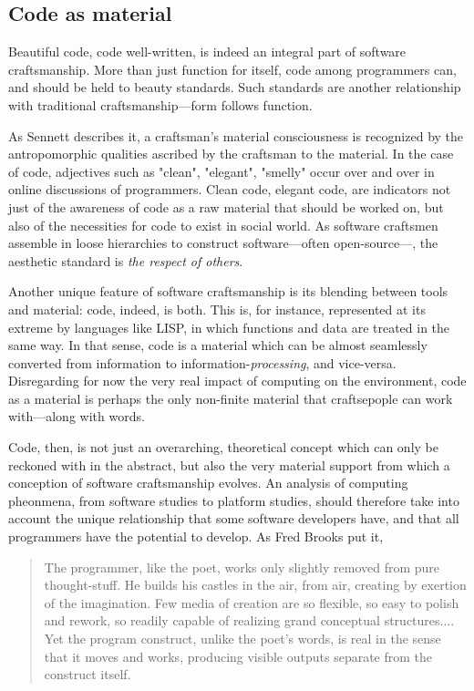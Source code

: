 \documentclass{article}
\begin{document}
\subsection{Code as material}

Beautiful code, code well-written, is indeed an integral part of software craftsmanship\cite{oram_beautiful_2007}. More than just function for itself, code among programmers can, and should be held to beauty standards\cite{pineiro_aesthetics_2003}. Such standards are another relationship with traditional craftsmanship---form follows function.

As Sennett describes it, a craftsman's material consciousness is recognized by the antropomorphic qualities ascribed by the craftsman to the material\cite{sennett_craftsman_2009}. In the case of code, adjectives such as "clean", "elegant", "smelly" occur over and over in online discussions of programmers. Clean code, elegant code, are indicators not just of the awareness of code as a raw material that should be worked on, but also of the necessities for code to exist in social world. As software craftsmen assemble in loose hierarchies to construct software---often open-source---, the aesthetic standard is \emph{the respect of others}\cite{abelson_structure_1979}.

Another unique feature of software craftsmanship is its blending between tools and material: code, indeed, is both. This is, for instance, represented at its extreme by languages like LISP, in which functions and data are treated in the same way. In that sense, code is a material which can be almost seamlessly converted from information to information-\emph{processing}, and vice-versa\cite{mccarthy_lisp_1965}. Disregarding for now the very real impact of computing on the environment\cite{kurp_green_2008}, code as a material is perhaps the only non-finite material that craftsepople can work with---along with words.

Code, then, is not just an overarching, theoretical concept which can only be reckoned with in the abstract, but also the very material support from which a conception of software craftsmanship evolves. An analysis of computing pheonmena, from software studies to platform studies, should therefore take into account the unique relationship that some software developers have, and that all programmers have the potential to develop. As Fred Brooks put it,

\begin{quote}
    The programmer, like the poet, works only slightly removed from pure thought-stuff. He builds his castles in the air, from air, creating by exertion of the imagination. Few media of creation are so flexible, so easy to polish and rework, so readily capable of realizing grand conceptual structures....
    Yet the program construct, unlike the poet's words, is real in the sense that it moves and works, producing visible outputs separate from the construct itself.\cite{brooks_mythical_1975}
\end{quote}
\end{document}
